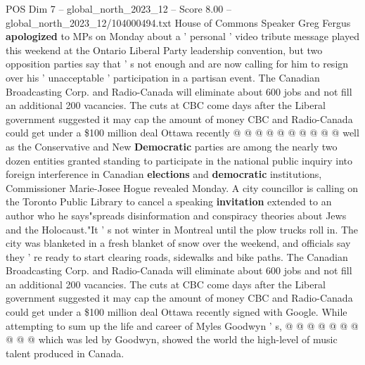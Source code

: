 \begin{textsample}{POS Dim 7 – global\_north\_2023\_12 – Score 8.00 – global\_north\_2023\_12/104000494.txt}
House of Commons Speaker Greg Fergus \textbf{apologized} to MPs on Monday about a ' personal ' video tribute message played this weekend at the Ontario Liberal Party leadership convention, but two opposition parties say that ' s not enough and are now calling for him to resign over his ' unacceptable ' participation in a partisan event.
The Canadian Broadcasting Corp. and Radio-Canada will eliminate about 600 jobs and not fill an additional 200 vacancies.
The cuts at CBC come days after the Liberal government suggested it may cap the amount of money CBC and Radio-Canada could get under a \$100 million deal Ottawa recently @ @ @ @ @ @ @ @ @ @ well as the Conservative and New \textbf{Democratic} parties are among the nearly two dozen entities granted standing to participate in the national public inquiry into foreign interference in Canadian \textbf{elections} and \textbf{democratic} institutions, Commissioner Marie-Josee Hogue revealed Monday.
A city councillor is calling on the Toronto Public Library to cancel a speaking \textbf{invitation} extended to an author who he says"spreads disinformation and conspiracy theories about Jews and the Holocaust."It ' s not winter in Montreal until the plow trucks roll in.
The city was blanketed in a fresh blanket of snow over the weekend, and officials say they ' re ready to start clearing roads, sidewalks and bike paths.
The Canadian Broadcasting Corp. and Radio-Canada will eliminate about 600 jobs and not fill an additional 200 vacancies.
The cuts at CBC come days after the Liberal government suggested it may cap the amount of money CBC and Radio-Canada could get under a \$100 million deal Ottawa recently signed with Google.
While attempting to sum up the life and career of Myles Goodwyn ' s, @ @ @ @ @ @ @ @ @ @ which was led by Goodwyn, showed the world the high-level of music talent produced in Canada.

\end{textsample}
